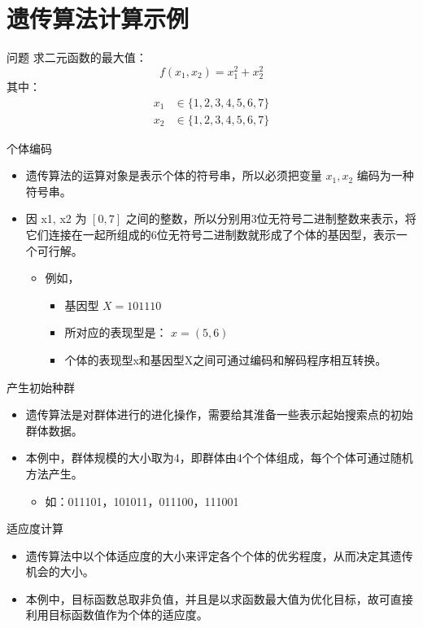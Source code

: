 \documentclass[presentation]{beamer}
\begin{document}
\section{遗传算法计算示例}
\label{sec:orgc06ba45}
\begin{frame}[label={sec:orgca30e5c}]{问题}
    求二元函数的最大值：
\[ f(x_1,x_2) =x_1^2+x_2^2 \]
其中：
\begin{align*}
   x_1 &\in \{1,2,3,4,5,6,7\} \\
   x_2 &\in \{1,2,3,4,5,6,7\} 
\end{align*}
\end{frame}
\begin{frame}[label={sec:org70c2168}]{个体编码}
\begin{itemize}
\item <2-> 遗传算法的运算对象是表示个体的符号串，所以必须把变量 \(x_1,x_2\) 编码为一种符号串。
\item <3-> 因 x1, x2 为 \([0,7]\) 之间的整数，所以分别用3位无符号二进制整数来表示，将它们连接在一起所组成的6位无符号二进制数就形成了个体的基因型，表示一个可行解。
\begin{itemize}
\item <4-> 例如，
\begin{itemize}
\item 基因型  \(X=101110\)
\item 所对应的表现型是： \(x=(5,6)\)
\item <5-> 个体的表现型x和基因型X之间可通过编码和解码程序相互转换。
\end{itemize}
\end{itemize}
\end{itemize}
\end{frame}
\begin{frame}[label={sec:orgb93aee3}]{产生初始种群}
\begin{itemize}
\item <2-> 遗传算法是对群体进行的进化操作，需要给其淮备一些表示起始搜索点的初始群体数据。
\item <3-> 本例中，群体规模的大小取为4，即群体由4个个体组成，每个个体可通过随机方法产生。
\begin{itemize}
\item 如：011101，101011，011100，111001
\end{itemize}
\end{itemize}
\end{frame}
\begin{frame}[label={sec:orga1a49f0}]{适应度计算}
\begin{itemize}
\item <2-> 遗传算法中以个体适应度的大小来评定各个个体的优劣程度，从而决定其遗传机会的大小。
\item <3-> 本例中，目标函数总取非负值，并且是以求函数最大值为优化目标，故可直接利用目标函数值作为个体的适应度。
\end{itemize}
\end{frame}
\end{document}
